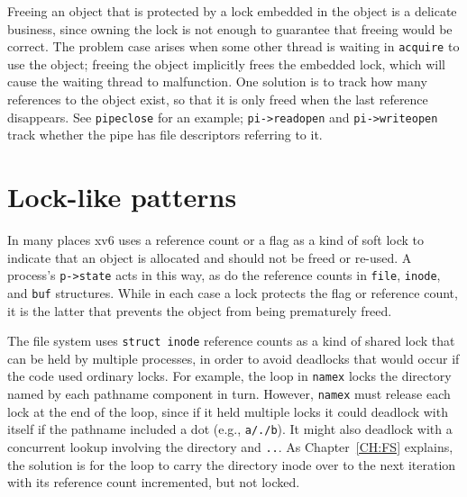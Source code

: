 Freeing an object that is protected by a lock embedded in the object
is a delicate business, since owning the lock is
not enough to guarantee that freeing would be correct. The problem
case arises when some other thread is waiting in {\tt acquire} to use
the object; freeing the object implicitly frees the embedded lock, which will
cause the waiting thread to malfunction. One solution is to track how
many references to the object exist, so that it is only freed when the
last reference disappears. See {\tt pipeclose}
 for an example;
{\tt pi->readopen} and {\tt pi->writeopen} track whether
the pipe has file descriptors referring to it.


\section{Lock-like patterns}

In many places xv6 uses a reference count or a flag as a kind of soft
lock to indicate that an object is allocated and should not be freed
or re-used. A process's {\tt p->state} acts in this way, as do the
reference counts in {\tt file}, {\tt inode}, and {\tt buf} structures.
While in each case a lock protects the flag or reference count, it is
the latter that prevents the object from being prematurely freed.

The file system uses {\tt struct inode} reference counts as a kind of
shared lock that can be held by multiple processes, in order to avoid
deadlocks that would occur if the code used ordinary locks. For
example, the loop in {\tt namex}  locks
the directory named by each pathname component in turn. However, {\tt namex}
must release each lock at the end of the loop, since if it
held multiple locks it could deadlock with itself if the pathname
included a dot (e.g., {\tt a/./b}). It might also deadlock with a
concurrent lookup involving the directory and {\tt ..}. As
Chapter~\ref{CH:FS} explains, the solution is for the loop to carry
the directory inode over to the next iteration with its reference
count incremented, but not locked.


